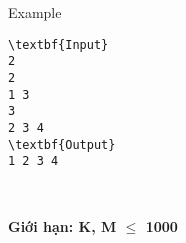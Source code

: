 Example
\begin{verbatim}
\textbf{Input}
2
2
1 3
3
2 3 4
\textbf{Output}
1 2 3 4\end{verbatim}

 

\textbf{Giới hạn: K, M  $\le$  1000}